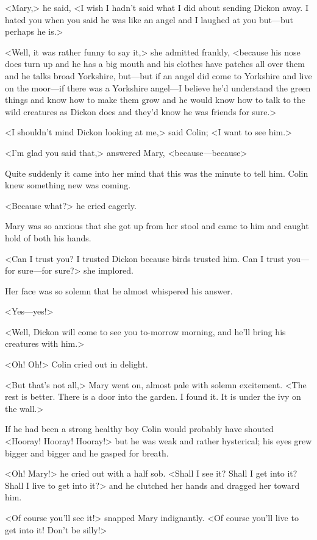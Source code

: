 <Mary,> he said, <I wish I hadn't said what I did about sending Dickon away. I hated you when you said he was like an angel and I laughed at you but—but perhaps he is.>

<Well, it was rather funny to say it,> she admitted frankly, <because his nose does turn up and he has a big mouth and his clothes have patches all over them and he talks broad Yorkshire, but—but if an angel did come to Yorkshire and live on the moor—if there was a Yorkshire angel—I believe he'd understand the green things and know how to make them grow and he would know how to talk to the wild creatures as Dickon does and they'd know he was friends for sure.>

<I shouldn't mind Dickon looking at me,> said Colin; <I want to see him.>

<I'm glad you said that,> answered Mary, <because—because\longdash>

Quite suddenly it came into her mind that this was the minute to tell him. Colin knew something new was coming.

<Because what?> he cried eagerly.

Mary was so anxious that she got up from her stool and came to him and caught hold of both his hands.

<Can I trust you? I trusted Dickon because birds trusted him. Can I trust you—for sure—for sure?> she implored.

Her face was so solemn that he almost whispered his answer.

<Yes—yes!>

<Well, Dickon will come to see you to-morrow morning, and he'll bring his creatures with him.>

<Oh! Oh!> Colin cried out in delight.

<But that's not all,> Mary went on, almost pale with solemn excitement. <The rest is better. There is a door into the garden. I found it. It is under the ivy on the wall.>

If he had been a strong healthy boy Colin would probably have shouted <Hooray! Hooray! Hooray!> but he was weak and rather hysterical; his eyes grew bigger and bigger and he gasped for breath.

<Oh! Mary!> he cried out with a half sob. <Shall I see it? Shall I get into it? Shall I live to get into it?> and he clutched her hands and dragged her toward him.

<Of course you'll see it!> snapped Mary indignantly. <Of course you'll live to get into it! Don't be silly!>

